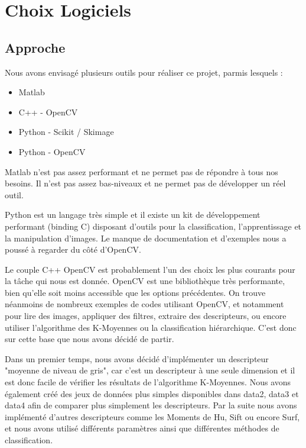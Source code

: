 \documentclass[12pt,a4paper,utf8x]{report}
\begin{document}
\chapter{Choix Logiciels}

\section{Approche}
    Nous avons envisagé plusieurs outils pour réaliser ce projet, parmis lesquels :

    \begin{itemize}
        \item Matlab
        \item C++ - OpenCV
        \item Python - Scikit / Skimage
        \item Python - OpenCV
    \end{itemize}

    Matlab n'est pas assez performant et ne permet pas de répondre à tous nos besoins. Il n'est pas assez bas-niveaux et ne permet pas de développer un réel outil.

    Python est un langage très simple et il existe un kit de développement performant (binding C) disposant d'outils pour la classification, l'apprentissage et la manipulation d'images. Le manque de documentation et d'exemples nous a poussé à regarder du côté d'OpenCV.

    Le couple C++ OpenCV est probablement l'un des choix les plus courants pour la tâche qui nous est donnée. OpenCV est une bibliothèque très performante, bien qu'elle soit moins accessible que les options précédentes. On trouve néanmoins de nombreux exemples de codes utilisant OpenCV, et notamment pour lire des images, appliquer des filtres, extraire des descripteurs, ou encore utiliser l'algorithme des K-Moyennes ou la classification hiérarchique. C'est donc sur cette base que nous avons décidé de partir.

    Dans un premier temps, nous avons décidé d'implémenter un descripteur "moyenne de niveau de gris", car c'est un descripteur à une seule dimension et il est donc facile de vérifier les résultats de l'algorithme K-Moyennes. Nous avons également créé des jeux de données plus simples disponibles dans data2, data3 et data4 afin de comparer plus simplement les descripteurs. Par la suite nous avons implémenté d'autres descripteurs comme les Moments de Hu, Sift ou encore Surf, et nous avons utilisé différents paramètres ainsi que différentes méthodes de classification.
\end{document}
